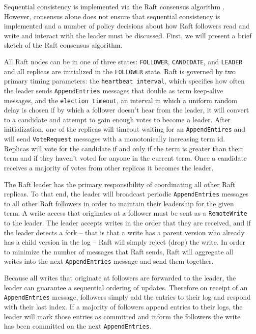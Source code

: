 \documentclass[10pt,conference,letterpaper]{IEEEtran}
\begin{document}
Sequential consistency is implemented via the Raft consensus algorithm \cite{ongaro_search_2014}. However, consensus alone does not ensure that sequential consistency is implemented and a number of policy decisions about how Raft followers read and write and interact with the leader must be discussed. First, we will present a brief sketch of the Raft consensus algorithm.

All Raft nodes can be in one of three states: \texttt{FOLLOWER}, \texttt{CANDIDATE}, and \texttt{LEADER} and all replicas are initialized in the \texttt{FOLLOWER} state. Raft is governed by two primary timing parameters: the \texttt{heartbeat interval}, which specifies how often the leader sends \texttt{AppendEntries} messages that double as term keep-alive messages, and the \texttt{election timeout}, an interval in which a uniform random delay is chosen if by which a follower doesn't hear from the leader, it will convert to a candidate and attempt to gain enough votes to become a leader. After initialization, one of the replicas will timeout waiting for an \texttt{AppendEntires} and will send \texttt{VoteRequest} messages with a monotonically increasing term id. Replicas will vote for the candidate if and only if the term is greater than their term and if they haven't voted for anyone in the current term. Once a candidate receives a majority of votes from other replicas it becomes the leader.

The Raft leader has the primary responsibility of coordinating all other Raft replicas. To that end, the leader will broadcast periodic \texttt{AppendEntries} messages to all other Raft followers in order to maintain their leadership for the given term. A write access that originates at a follower must be sent as a \texttt{RemoteWrite} to the leader. The leader accepts writes in the order that they are received, and if the leader detects a fork -- that is that a write has a parent version who already has a child version in the log -- Raft will simply reject (drop) the write. In order to minimize the number of messages that Raft sends, Raft will aggregate all writes into the next \texttt{AppendEntries} message and send them together.

Because all writes that originate at followers are forwarded to the leader, the leader can guarantee a sequential ordering of updates. Therefore on receipt of an \texttt{AppendEntries} message, followers simply add the entries to their log and respond with their last index. If a majority of followers append entries to their logs, the leader will mark those entries as committed and inform the followers the write has been committed on the next \texttt{AppendEntries}.
\end{document}
